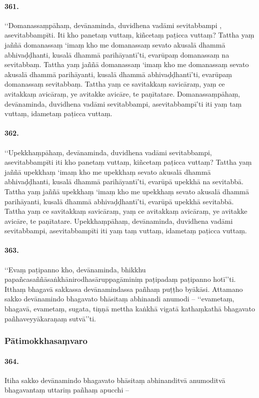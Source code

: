 \paragraph{361.} ‘‘Domanassaṃpāhaṃ, devānaminda, duvidhena vadāmi sevitabbampi , asevitabbampīti. Iti kho panetaṃ vuttaṃ, kiñcetaṃ paṭicca vuttaṃ? Tattha yaṃ jaññā domanassaṃ ‘imaṃ kho me domanassaṃ sevato akusalā dhammā abhivaḍḍhanti, kusalā dhammā parihāyantī’ti, evarūpaṃ domanassaṃ na sevitabbaṃ. Tattha yaṃ jaññā domanassaṃ ‘imaṃ kho me domanassaṃ sevato akusalā dhammā parihāyanti, kusalā dhammā abhivaḍḍhantī’ti, evarūpaṃ domanassaṃ sevitabbaṃ. Tattha yaṃ ce savitakkaṃ savicāraṃ, yaṃ ce avitakkaṃ avicāraṃ, ye avitakke avicāre, te paṇītatare. Domanassaṃpāhaṃ, devānaminda, duvidhena vadāmi sevitabbampi, asevitabbampī’ti iti yaṃ taṃ vuttaṃ, idametaṃ paṭicca vuttaṃ.

\paragraph{362.} ‘‘Upekkhaṃpāhaṃ, devānaminda, duvidhena vadāmi sevitabbampi, asevitabbampīti iti kho panetaṃ vuttaṃ, kiñcetaṃ paṭicca vuttaṃ? Tattha yaṃ jaññā upekkhaṃ ‘imaṃ kho me upekkhaṃ sevato akusalā dhammā abhivaḍḍhanti, kusalā dhammā parihāyantī’ti, evarūpā upekkhā na sevitabbā. Tattha yaṃ jaññā upekkhaṃ ‘imaṃ kho me upekkhaṃ sevato akusalā dhammā parihāyanti, kusalā dhammā abhivaḍḍhantī’ti, evarūpā upekkhā sevitabbā. Tattha yaṃ ce savitakkaṃ savicāraṃ, yaṃ ce avitakkaṃ avicāraṃ, ye avitakke avicāre, te paṇītatare. Upekkhaṃpāhaṃ, devānaminda, duvidhena vadāmi sevitabbampi, asevitabbampīti iti yaṃ taṃ vuttaṃ, idametaṃ paṭicca vuttaṃ.

\paragraph{363.} ‘‘Evaṃ paṭipanno kho, devānaminda, bhikkhu papañcasaññāsaṅkhānirodhasāruppagāminiṃ paṭipadaṃ paṭipanno hotī’’ti. Itthaṃ bhagavā sakkassa devānamindassa pañhaṃ puṭṭho byākāsi. Attamano sakko devānamindo bhagavato bhāsitaṃ abhinandi anumodi – ‘‘evametaṃ, bhagavā, evametaṃ, sugata, tiṇṇā mettha kaṅkhā vigatā kathaṃkathā bhagavato pañhaveyyākaraṇaṃ sutvā’’ti.

\subsubsection{Pātimokkhasaṃvaro}

\paragraph{364.} Itiha sakko devānamindo bhagavato bhāsitaṃ abhinanditvā anumoditvā bhagavantaṃ uttariṃ pañhaṃ apucchi –

